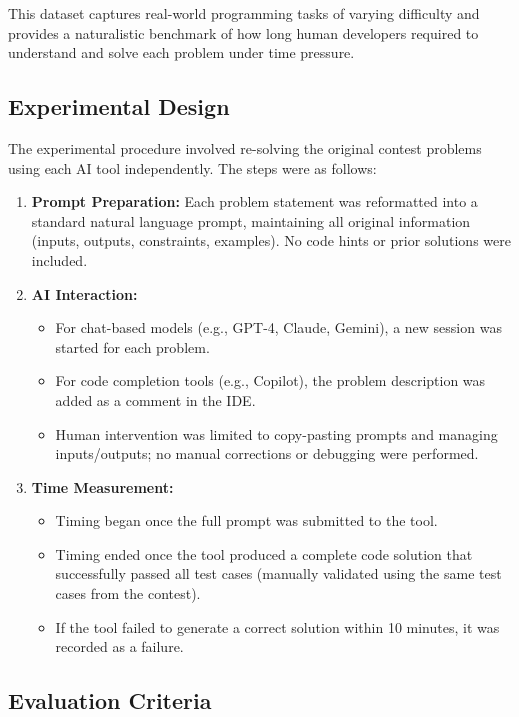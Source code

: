 \documentclass[conference]{IEEEtran}
\begin{document}
This dataset captures real-world programming tasks of varying difficulty and provides a naturalistic benchmark of how long human developers required to understand and solve each problem under time pressure.





\subsection{Experimental Design}

The experimental procedure involved re-solving the original contest problems using each AI tool independently. The steps were as follows:

\begin{enumerate}
    \item \textbf{Prompt Preparation:} Each problem statement was reformatted into a standard natural language prompt, maintaining all original information (inputs, outputs, constraints, examples). No code hints or prior solutions were included.
    \item \textbf{AI Interaction:}
    \begin{itemize}
        \item For chat-based models (e.g., GPT-4, Claude, Gemini), a new session was started for each problem.
        \item For code completion tools (e.g., Copilot), the problem description was added as a comment in the IDE.
        \item Human intervention was limited to copy-pasting prompts and managing inputs/outputs; no manual corrections or debugging were performed.
    \end{itemize}
    \item \textbf{Time Measurement:}
    \begin{itemize}
        \item Timing began once the full prompt was submitted to the tool.
        \item Timing ended once the tool produced a complete code solution that successfully passed all test cases (manually validated using the same test cases from the contest).
        \item If the tool failed to generate a correct solution within 10 minutes, it was recorded as a failure.
    \end{itemize}
\end{enumerate}

\subsection{Evaluation Criteria}
\end{document}
